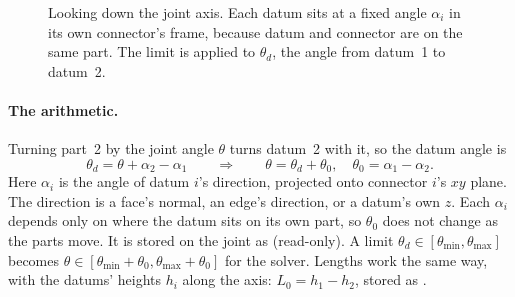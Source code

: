 \begin{figure}[h]
\centering
{}
\caption{Looking down the joint axis. Each datum sits at a fixed angle $\alpha_i$ in its own connector's frame,
because datum and connector are on the same part. The limit is applied to $\theta_d$, the angle from datum~1 to
datum~2.}
\label{fig:limit-datum}
\end{figure}

\paragraph{The arithmetic.} Turning part~2 by the joint angle $\theta$ turns datum~2 with it, so the datum angle is
\[
  \theta_d = \theta + \alpha_2 - \alpha_1 \qquad\Longrightarrow\qquad \theta = \theta_d + \theta_0,\quad
  \theta_0 = \alpha_1 - \alpha_2 .
\]
Here $\alpha_i$ is the angle of datum $i$'s direction, projected onto connector $i$'s $xy$ plane. The direction is a
face's normal, an edge's direction, or a datum's own $z$. Each $\alpha_i$ depends only on where the datum sits on its
own part, so $\theta_0$ does not change as the parts move. It is stored on the joint as 
(read-only). A limit $\theta_d \in [\theta_{\min}, \theta_{\max}]$ becomes $\theta \in [\theta_{\min} + \theta_0,
\theta_{\max} + \theta_0]$ for the solver. Lengths work the same way, with the datums' heights $h_i$ along the axis:
$L_0 = h_1 - h_2$, stored as .

